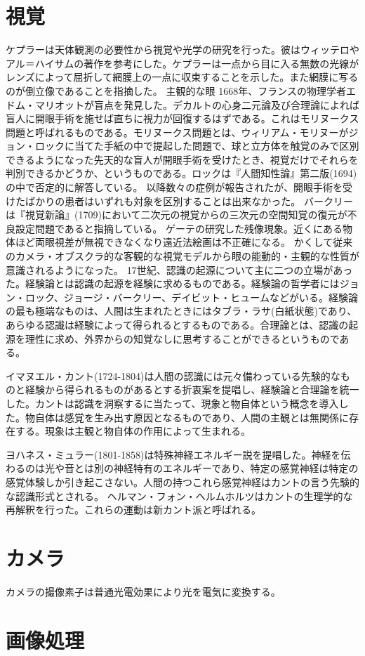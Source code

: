 \section{視覚}
	ケプラーは天体観測の必要性から視覚や光学の研究を行った。彼はウィッテロやアル＝ハイサムの著作を参考にした。ケプラーは一点から目に入る無数の光線がレンズによって屈折して網膜上の一点に収束することを示した。また網膜に写るのが倒立像であることを指摘した。
	主観的な眼
	1668年、フランスの物理学者エドム・マリオットが盲点を発見した。デカルトの心身二元論及び合理論によれば盲人に開眼手術を施せば直ちに視力が回復するはずである。これはモリヌークス問題と呼ばれるものである。モリヌークス問題とは、ウィリアム・モリヌーがジョン・ロックに当てた手紙の中で提起した問題で、球と立方体を触覚のみで区別できるようになった先天的な盲人が開眼手術を受けたとき、視覚だけでそれらを判別できるかどうか、というものである。ロックは『人間知性論』第二版(1694)の中で否定的に解答している。
	以降数々の症例が報告されたが、開眼手術を受けたばかりの患者はいずれも対象を区別することは出来なかった。%
	バークリーは『視覚新論』(1709)において二次元の視覚からの三次元の空間知覚の復元が不良設定問題であると指摘している。
	ゲーテの研究した残像現象。近くにある物体ほど両眼視差が無視できなくなり遠近法絵画は不正確になる。
	かくして従来のカメラ・オブスクラ的な客観的な視覚モデルから眼の能動的・主観的な性質が意識されるようになった。
	17世紀、認識の起源について主に二つの立場があった。経験論とは認識の起源を経験に求めるものである。経験論の哲学者にはジョン・ロック、ジョージ・バークリー、デイビット・ヒュームなどがいる。経験論の最も極端なものは、人間は生まれたときにはタブラ・ラサ(白紙状態)であり、あらゆる認識は経験によって得られるとするものである。合理論とは、認識の起源を理性に求め、外界からの知覚なしに思考することができるというものである。

	イマヌエル・カント(1724-1804)は人間の認識には元々備わっている先験的なものと経験から得られるものがあるとする折衷案を提唱し、経験論と合理論を統一した。カントは認識を洞察するに当たって、現象と物自体という概念を導入した。物自体は感覚を生み出す原因となるものであり、人間の主観とは無関係に存在する。現象は主観と物自体の作用によって生まれる。

	ヨハネス・ミュラー(1801-1858)は特殊神経エネルギー説を提唱した。神経を伝わるのは光や音とは別の神経特有のエネルギーであり、特定の感覚神経は特定の感覚体験しか引き起こさない。人間の持つこれら感覚神経はカントの言う先験的な認識形式とされる。
	ヘルマン・フォン・ヘルムホルツはカントの生理学的な再解釈を行った。これらの運動は新カント派と呼ばれる。
\section{カメラ}
	カメラの撮像素子は普通光電効果により光を電気に変換する。
\section{画像処理}